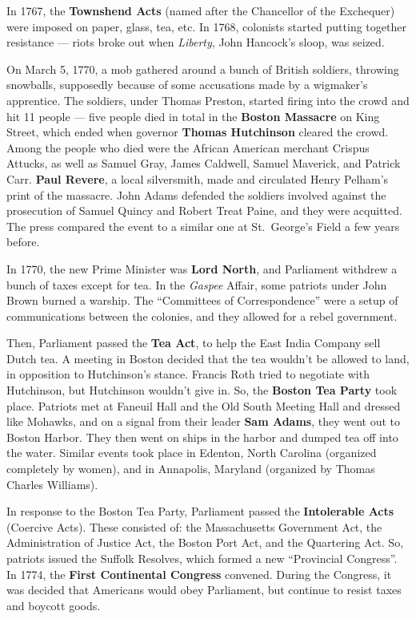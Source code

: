 In 1767, the \textbf{Townshend Acts} (named after the Chancellor of the Exchequer)
were imposed on paper, glass, tea, etc.
In 1768, colonists started putting together resistance ---
riots broke out when \textit{Liberty}, John Hancock's sloop, was seized.

On March 5, 1770, a mob gathered around a bunch of British soldiers, throwing snowballs,
supposedly because of some accusations made by a wigmaker's apprentice.
The soldiers, under Thomas Preston, started firing into the crowd and hit 11 people ---
five people died in total in the \textbf{Boston Massacre} on King Street,
which ended when governor \textbf{Thomas Hutchinson} cleared the crowd.
Among the people who died were the African American merchant Crispus Attucks,
as well as Samuel Gray, James Caldwell, Samuel Maverick, and Patrick Carr.
\textbf{Paul Revere}, a local silversmith, made and circulated Henry Pelham's print of the massacre.
John Adams defended the soldiers involved against the prosecution of Samuel Quincy and Robert Treat Paine,
and they were acquitted.
The press compared the event to a similar one at St.\ George's Field a few years before.

In 1770, the new Prime Minister was \textbf{Lord North},
and Parliament withdrew a bunch of taxes except for tea.
In the \textit{Gaspee} Affair, some patriots under John Brown burned a warship.
The ``Committees of Correspondence'' were a setup of communications between the colonies,
and they allowed for a rebel government.

Then, Parliament passed the \textbf{Tea Act}, to help the East India Company sell Dutch tea.
A meeting in Boston decided that the tea wouldn't be allowed to land,
in opposition to Hutchinson's stance.
Francis Roth tried to negotiate with Hutchinson, but Hutchinson wouldn't give in.
So, the \textbf{Boston Tea Party} took place.
Patriots met at Faneuil Hall and the Old South Meeting Hall and dressed like Mohawks,
and on a signal from their leader \textbf{Sam Adams}, they went out to Boston Harbor.
They then went on ships in the harbor and dumped tea off into the water.
Similar events took place in Edenton, North Carolina (organized completely by women),
and in Annapolis, Maryland (organized by Thomas Charles Williams).

In response to the Boston Tea Party, Parliament passed the \textbf{Intolerable Acts} (Coercive Acts).
These consisted of:
the Massachusetts Government Act,
the Administration of Justice Act,
the Boston Port Act,
and the Quartering Act.
So, patriots issued the Suffolk Resolves, which formed a new ``Provincial Congress''.
In 1774, the \textbf{First Continental Congress} convened.
During the Congress, it was decided that Americans would obey Parliament,
but continue to resist taxes and boycott goods.

